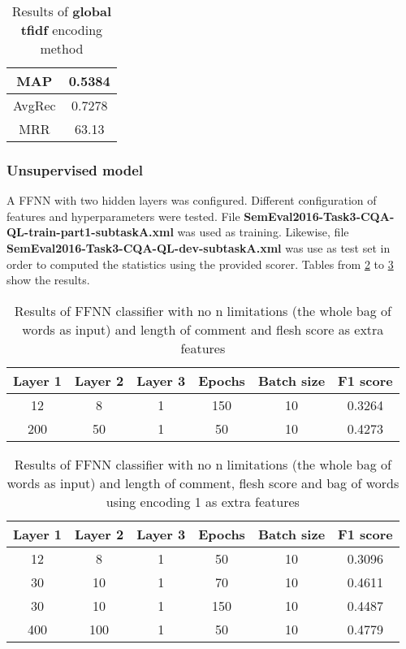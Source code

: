 \begin{table}[!htbp]
\centering
\caption{Results of \textbf{global tfidf} encoding method}
\label{1_3}
\begin{tabular}{c|c}
MAP & 0.5384   \\\hline
AvgRec &  0.7278 \\\hline
MRR &  63.13 
\end{tabular}
\end{table}

\subsubsection{Unsupervised model}
A FFNN with two hidden layers was configured. Different configuration of features and hyperparameters were tested. File \textbf{SemEval2016-Task3-CQA-QL-train-part1-subtaskA.xml} was used as training. Likewise, file \textbf{SemEval2016-Task3-CQA-QL-dev-subtaskA.xml} was use as test set in order to computed the statistics using the provided scorer. Tables from \ref{f1} to \ref{f2} show the results.

\begin{table}[!htbp]
\centering
\caption{Results of FFNN classifier with no n limitations (the whole bag of words as input) and length of comment and flesh score as extra features}
\label{f1}
\begin{tabular}{c|c|c|c|c|c}
\textbf{Layer 1} & \textbf{Layer 2} & \textbf{Layer 3} &  \textbf{Epochs} & \textbf{Batch size} & F1 score\\\hline
12 &8 &1& 150& 10& 0.3264\\\hline
200& 50& 1& 50& 10&  0.4273
\end{tabular}
\end{table}

\begin{table}[!htbp]
\centering
\caption{Results of FFNN classifier with no n limitations (the whole bag of words as input) and length of comment, flesh score and bag of words using encoding 1 as extra features}
\label{f2}
\begin{tabular}{c|c|c|c|c|c}
\textbf{Layer 1} & \textbf{Layer 2} & \textbf{Layer 3} &  \textbf{Epochs} & \textbf{Batch size} & F1 score\\\hline
12 &8 &1 &50 &10 & 0.3096\\\hline
30 &10& 1 &70& 10 & 0.4611\\\hline
30 &10& 1 &150& 10 & 0.4487\\\hline
400 &100& 1 &50 &10& 0.4779
\end{tabular}
\end{table}


